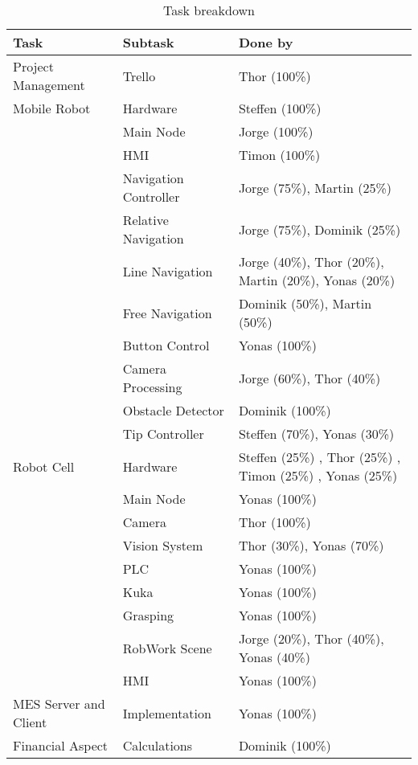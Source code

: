 \begin{table}[!h]
\centering
\begin{tabular}{lll}
\textbf{Task} & \textbf{Subtask} & \textbf{Done by} \\ \hline
Project Management     & Trello & Thor (100\%)        \\ \hline
Mobile Robot & Hardware & Steffen (100\%)       \\ \hline
 & Main Node & Jorge (100\%)       \\ \hline
 & HMI & Timon (100\%)        \\ \hline 
 & Navigation Controller & Jorge (75\%), Martin (25\%)       \\ \hline 
 & Relative Navigation & Jorge (75\%), Dominik (25\%)      \\ \hline
 & Line Navigation & Jorge (40\%), Thor (20\%), Martin (20\%), Yonas (20\%)   \\ \hline
 & Free Navigation & Dominik (50\%), Martin (50\%)     \\ \hline
 & Button Control & Yonas (100\%)       \\ \hline
 & Camera Processing & Jorge (60\%), Thor (40\%)      \\ \hline
 & Obstacle Detector & Dominik (100\%)       \\ \hline 
 & Tip Controller & Steffen (70\%), Yonas (30\%)        \\ \hline 
Robot Cell & Hardware & Steffen (25\%) , Thor (25\%) , Timon (25\%) , Yonas (25\%)  \\ \hline
 & Main Node & Yonas (100\%)        \\ \hline
 & Camera & Thor (100\%)        \\ \hline
 & Vision System & Thor (30\%), Yonas (70\%)       \\ \hline
 & PLC & Yonas (100\%)        \\ \hline
 & Kuka & Yonas (100\%)      \\ \hline
 & Grasping & Yonas (100\%)        \\ \hline
 & RobWork Scene & Jorge (20\%), Thor (40\%), Yonas (40\%)         \\ \hline
 & HMI & Yonas (100\%)         \\ \hline
MES Server and Client & Implementation & Yonas (100\%)        \\ \hline
Financial Aspect & Calculations & Dominik (100\%)        \\ \hline
\end{tabular}
\caption{Task breakdown}
\label{tab:taks_breakdown}
\end{table}